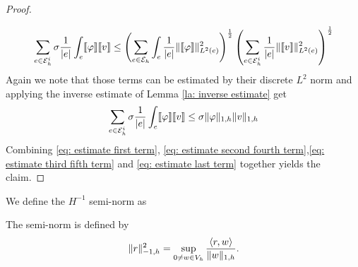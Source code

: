 \begin{proof}
\begin{align}
\end{align}
\begin{align*}
	\sum_{e \in \mathcal{E}_h^i} \sigma \frac 1 {|e|} \int_e \llbracket \varphi \rrbracket \llbracket v \rrbracket \leq 		
		\left( \sum\limits_{e \in \mathcal{E}_h}\int_{e} \frac 1 {|e|} \lVert \llbracket \varphi \rrbracket \rVert_{L^2(e)}^2 \right)^{\frac 1 2}
		\left(\sum_{e \in \mathcal{E}_h^i} \frac 1 {|e|} \lVert \llbracket v \rrbracket \rVert_{L^2(e)}^2 \right)^{\frac 1 2}
\end{align*}
Again we note that those terms can be estimated by their discrete $L^2$ norm and applying the inverse estimate of Lemma \ref{la: inverse estimate} get
\begin{align}
\sum_{e \in \mathcal{E}_h^i} \sigma \frac 1 {|e|} \int_e \llbracket \varphi \rrbracket \llbracket v \rrbracket \leq \sigma \lVert \varphi \rVert_{1,h} \lVert v \rVert_{1,h} \label{eq: estimate last term}
\end{align}	
Combining \eqref{eq: estimate first term}, \eqref{eq: estimate second fourth term},\eqref{eq: estimate third fifth term} and \eqref{eq: estimate last term} together yields the claim.
\end{proof}

We define the $H^{-1}$ semi-norm as 
\begin{definition} \label{def: h-1 seminorm}
	The semi-norm is defined by 
	\[
		\lVert r \rVert_{-1,h} ^2 = \sup_{0 \neq w \in V_h} \frac {{ \langle r, w \rangle } } {\lVert w \rVert_{1,h}}.
	\]
\end{definition}

